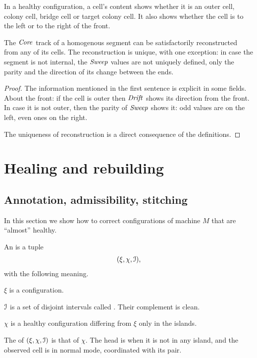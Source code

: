 \documentclass[11pt]{memoir}
\theoremstyle{definition} %
\newcommand{\fld}[1]{\ensuremath{\textit{#1\/}}}
\newcommand{\Core}{\fld{Core}}
\newcommand{\Drift}{\fld{Drift}}
\newcommand{\Sweep}{\fld{Sweep}}
\begin{document}
\begin{lemma}\label{lem:infer-between}
In a healthy configuration, 
a cell's content shows whether it is an outer cell, colony cell, bridge cell or target colony cell.
It also shows whether the cell is to the left or to the right of the front.

The \( \Core \) track of a homogenous segment can be satisfactorily reconstructed
from any of its cells.
The reconstruction is unique, with one exception: in case the segment is not internal, the
\( \Sweep \) values are not uniquely defined, only the parity and the direction of its 
change between the ends.
\end{lemma}
\begin{proof}
The information mentioned in the first sentence is explicit in some fields.
About the front: if the cell is outer then \( \Drift \) shows its direction from the front.
In case it is not outer, then the parity of \( \Sweep \) shows it: odd values are on the left, even 
ones on the right. 

The uniqueness of reconstruction is a direct consequence of the definitions.
\end{proof}

\section{Healing and rebuilding}\label{sec:healing}

\subsection{Annotation, admissibility, stitching}\label{sec:stitching}

In this section we show how to correct configurations of machine \( M \)
that are ``almost'' healthy.

\begin{definition}[Annotation]\label{def:annotation}
  An  is a tuple
  \begin{align*}
    (\xi,\chi, \mathcal{I}),
  \end{align*}
  with the following meaning.

  \( \xi \) is a configuration.

  \( \mathcal{I} \) is a set of disjoint intervals called .
Their complement is clean.

  \( \chi \) is a healthy configuration differing from \( \xi \) only in the islands.

The  of \( (\xi,\chi, \mathcal{I}) \) is that of \( \chi \).
The head is  when it is not in any island,
and the observed cell is in normal mode, coordinated with its pair.
  \end{definition}
\end{document}
